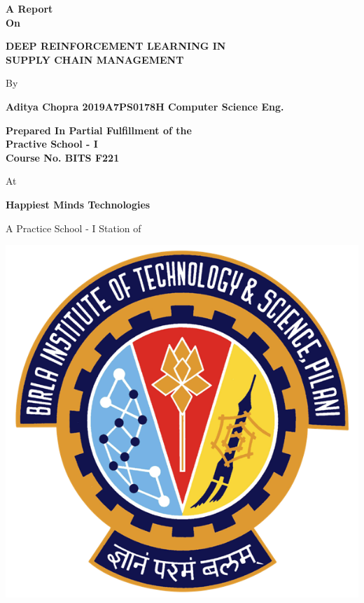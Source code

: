 \documentclass{article}
\begin{document}
\begin{titlepage}
    \begin{center}
        \vspace*{1cm}

        \large\textbf{A Report \\ On}

        \vspace{0.5cm}

        \LARGE\textbf{DEEP REINFORCEMENT LEARNING IN \\ SUPPLY CHAIN MANAGEMENT}

        \vspace{0.5cm}

        \large By

        \vspace{1.5cm}

        \textbf{Aditya Chopra \hfill 2019A7PS0178H \hfill Computer Science Eng.}

        \vspace{0.5cm}
        \Large\textbf{Prepared In Partial Fulfillment of the \\ Practive School - I \\ Course No. BITS F221}

        \vspace{1cm}

        \large At

        \vspace{0.5cm}
        \textbf{Happiest Minds Technologies}

        \vspace{0.5cm}
        A Practice School - I Station of

        \vspace{0.8cm}
        \includegraphics{bits_logo.png}
        \vspace{0.8cm}


\end{center}
\end{titlepage}
\end{document}
